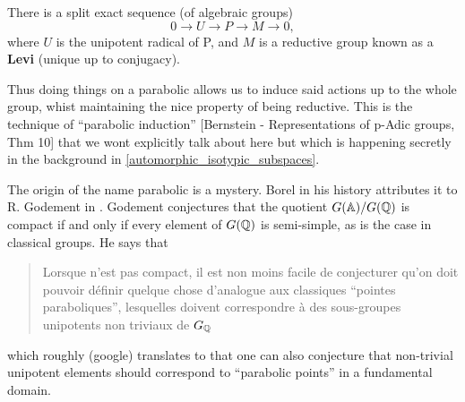 \begin{Lemma}
    There is a split exact sequence (of algebraic groups)
    \[0 \to U \to P \to M \to 0,\]
    where \(U\) is the unipotent radical of P, and \(M\) is a reductive group known as a \textbf{Levi} (unique up to conjugacy).
\end{Lemma}

Thus doing things on a parabolic allows us to induce said actions up to the whole group, whist maintaining the nice property of being reductive. This is the technique of ``parabolic induction'' [Bernstein - Representations of p-Adic groups, Thm 10] that we wont explicitly talk about here but which is happening secretly in the background in \ref{automorphic_isotypic_subspaces}.

\begin{Remark}
    The origin of the name parabolic is a mystery. Borel in his history \cite[VI.\S 2]{EssaysHistoryLie} attributes it to R. Godement in \cite{godementGroupesLineairesAlgebriques}. Godement conjectures that the quotient \(G(\A) / G(\Q)\) is compact if and only if every element of \(G(\Q)\) is semi-simple, as is the case in classical groups.  He says that 
    \begin{quote}
        Lorsque n'est pas compact, il est non moins facile de conjecturer qu’on doit pouvoir définir quelque chose d’analogue aux classiques ``pointes paraboliques'', lesquelles doivent correspondre à des  sous-groupes unipotents non triviaux de \(G_\Q\)
    \end{quote}
    which roughly (google) translates to that one can also conjecture that non-trivial unipotent elements should correspond to ``parabolic points'' in a fundamental domain.


\end{Remark}
